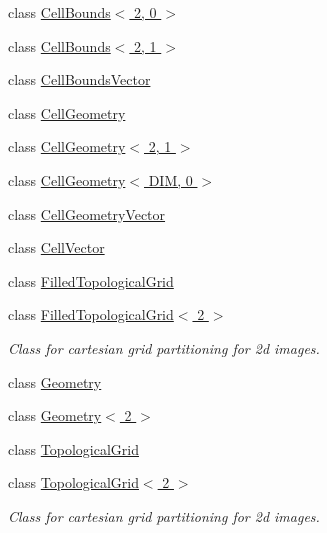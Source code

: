\begin{DoxyCompactItemize}
\item 
class \hyperlink{classnifty_1_1cgp_1_1CellBounds_3_012_00_010_01_4}{Cell\+Bounds$<$ 2, 0 $>$}
\item 
class \hyperlink{classnifty_1_1cgp_1_1CellBounds_3_012_00_011_01_4}{Cell\+Bounds$<$ 2, 1 $>$}
\item 
class \hyperlink{classnifty_1_1cgp_1_1CellBoundsVector}{Cell\+Bounds\+Vector}
\item 
class \hyperlink{classnifty_1_1cgp_1_1CellGeometry}{Cell\+Geometry}
\item 
class \hyperlink{classnifty_1_1cgp_1_1CellGeometry_3_012_00_011_01_4}{Cell\+Geometry$<$ 2, 1 $>$}
\item 
class \hyperlink{classnifty_1_1cgp_1_1CellGeometry_3_01DIM_00_010_01_4}{Cell\+Geometry$<$ D\+I\+M, 0 $>$}
\item 
class \hyperlink{classnifty_1_1cgp_1_1CellGeometryVector}{Cell\+Geometry\+Vector}
\item 
class \hyperlink{classnifty_1_1cgp_1_1CellVector}{Cell\+Vector}
\item 
class \hyperlink{classnifty_1_1cgp_1_1FilledTopologicalGrid}{Filled\+Topological\+Grid}
\item 
class \hyperlink{classnifty_1_1cgp_1_1FilledTopologicalGrid_3_012_01_4}{Filled\+Topological\+Grid$<$ 2 $>$}
\begin{DoxyCompactList}\small\item\em Class for cartesian grid partitioning for 2d images. \end{DoxyCompactList}\item 
class \hyperlink{classnifty_1_1cgp_1_1Geometry}{Geometry}
\item 
class \hyperlink{classnifty_1_1cgp_1_1Geometry_3_012_01_4}{Geometry$<$ 2 $>$}
\item 
class \hyperlink{classnifty_1_1cgp_1_1TopologicalGrid}{Topological\+Grid}
\item 
class \hyperlink{classnifty_1_1cgp_1_1TopologicalGrid_3_012_01_4}{Topological\+Grid$<$ 2 $>$}
\begin{DoxyCompactList}\small\item\em Class for cartesian grid partitioning for 2d images. \end{DoxyCompactList}\end{DoxyCompactItemize}
